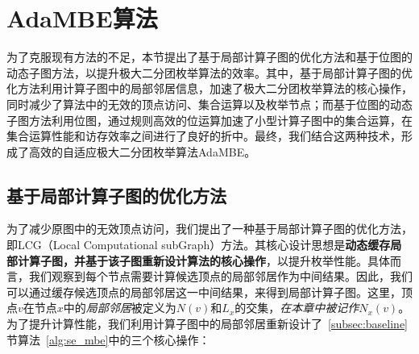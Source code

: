 



  

\section{AdaMBE算法}

为了克服现有方法的不足，本节提出了基于局部计算子图的优化方法和基于位图的动态子图方法，以提升极大二分团枚举算法的效率。其中，基于局部计算子图的优化方法利用计算子图中的局部邻居信息，加速了极大二分团枚举算法的核心操作，同时减少了算法中的无效的顶点访问、集合运算以及枚举节点；而基于位图的动态子图方法利用位图，通过规则高效的位运算加速了小型计算子图中的集合运算，在集合运算性能和访存效率之间进行了良好的折中。最终，我们结合这两种技术，形成了高效的自适应极大二分团枚举算法AdaMBE。

\subsection{基于局部计算子图的优化方法}
\label{subsec:ada_design_2}

为了减少原图中的无效顶点访问，我们提出了一种基于局部计算子图的优化方法，即LCG（Local Computational subGraph）方法。其核心设计思想是\textbf{动态缓存局部计算子图，并基于该子图重新设计算法的核心操作}，以提升枚举性能。具体而言，我们观察到每个节点需要计算候选顶点的局部邻居作为中间结果。因此，我们可以通过缓存候选顶点的局部邻居这一中间结果，来得到局部计算子图。这里，顶点$v$在节点$x$中的\emph{局部邻居}被定义为$N(v)$和$L_x$的交集，\emph{在本章中被记作$N_x(v)$}。为了提升计算性能，我们利用计算子图中的局部邻居重新设计了~\ref{subsec:baseline}节算法~\ref{alg:se_mbe}中的三个核心操作：

